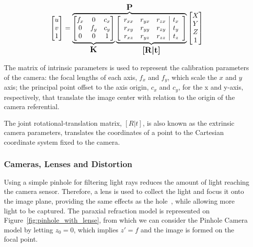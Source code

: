 \begin{equation}
	\label{eq:camera_transform_full}
	\begin{bmatrix}
		u \\
		v \\
		1
	\end{bmatrix}
	= 
	\overbrace{
		\underbrace{
			\begin{bmatrix}
				f_x & 0 & c_x \\
				0 & f_y & c_y \\
				0 & 0 & 1 
			\end{bmatrix}
		}_\text{\large\textbf{K}}
		\underbrace{
			\left[
				\begin{array}{ccc|c}
					r_{xx} & r_{yx} & r_{zx} & t_x \\
					r_{xy} & r_{yy} & r_{zy} & t_y \\
					r_{xz} & r_{yz} & r_{zz} & t_z 
				\end{array}
		\right]
		}_\text{\large\textbf{[R|t]}}
	}^\text{\large\textbf{P}}
	\begin{bmatrix}
		X \\
		Y \\
		Z \\
		1
	\end{bmatrix}
\end{equation}

The matrix of intrinsic parameters is used to represent the calibration parameters of the camera: the focal lengths of each axis, $f_x$ and $f_y$, which scale the $x$ and $y$ axis; the principal point offset to the axis origin, $c_x$ and $c_y$, for the x and y-axis, respectively, that translate the image center with relation to the origin of the camera referential. 

The joint rotational-translation matrix, $[R|t]$, is also known as the extrinsic camera parameters, translates the coordinates of a point to the Cartesian coordinate system fixed to the camera.


\subsubsection{Cameras, Lenses and Distortion}
Using a simple pinhole for filtering light rays 
reduces the amount of light reaching the camera sensor. Therefore, a lens is used to collect the light and focus it onto the image plane, providing the same effects as the hole~\cite{Sturm2010}, while allowing more light to be captured. The paraxial refraction model is represented on Figure~\ref{fig:pinhole_with_lense}, from which we can consider the Pinhole Camera model by letting $z_0 = 0$, which implies $z' = f$ and the image is formed on the focal point.

